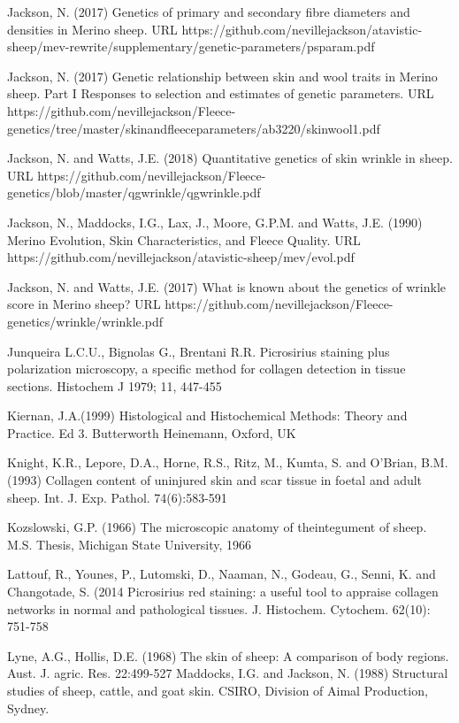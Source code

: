 \documentclass[titlepage]{article}  %
\begin{document}
\begin{thebibliography}{99}
Jackson, N. (2017) Genetics of primary and secondary fibre diameters and densities in Merino sheep. URL https://github.com/nevillejackson/atavistic-sheep/mev-rewrite/supplementary/genetic-parameters/psparam.pdf

Jackson, N. (2017) Genetic relationship between skin and wool traits in Merino sheep. Part I Responses to selection and estimates of genetic parameters. URL https://github.com/nevillejackson/Fleece-genetics/tree/master/skinandfleeceparameters/ab3220/skinwool1.pdf

Jackson, N. and Watts, J.E. (2018) Quantitative genetics of skin wrinkle in sheep. URL https://github.com/nevillejackson/Fleece-genetics/blob/master/qgwrinkle/qgwrinkle.pdf

Jackson, N., Maddocks, I.G., Lax, J., Moore, G.P.M. and Watts, J.E. (1990) Merino Evolution, Skin Characteristics, and Fleece Quality. URL https://github.com/nevillejackson/atavistic-sheep/mev/evol.pdf 

Jackson, N. and Watts, J.E. (2017) What is known about the genetics of wrinkle score in Merino sheep? URL https://github.com/nevillejackson/Fleece-genetics/wrinkle/wrinkle.pdf

Junqueira L.C.U., Bignolas G., Brentani R.R. Picrosirius staining plus polarization microscopy, a specific method for collagen detection in tissue sections. Histochem J 1979; 11, 447-455

Kiernan, J.A.(1999) Histological and Histochemical Methods: Theory and Practice. Ed 3. Butterworth Heinemann, Oxford, UK

Knight, K.R., Lepore, D.A., Horne, R.S., Ritz, M., Kumta, S. and O'Brian, B.M. (1993) Collagen content of uninjured skin and scar tissue in foetal and adult sheep. Int. J. Exp. Pathol. 74(6):583-591

Kozslowski, G.P. (1966) The microscopic anatomy of theintegument of sheep. M.S. Thesis, Michigan State University, 1966

Lattouf, R., Younes, P., Lutomski, D., Naaman, N., Godeau, G., Senni, K. and Changotade, S. (2014  Picrosirius red staining: a useful tool to appraise collagen networks in normal and pathological tissues. J. Histochem. Cytochem. 62(10): 751-758

Lyne, A.G., Hollis, D.E. (1968) The skin of sheep: A comparison of body regions. Aust. J. agric. Res. 22:499-527
Maddocks, I.G. and Jackson, N. (1988) Structural studies of sheep, cattle, and goat skin. CSIRO, Division of Aimal Production, Sydney.


\end{thebibliography}
\end{document}
